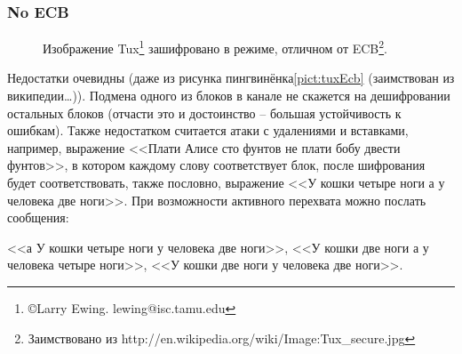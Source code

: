 \begin{frame}
    \frametitle{No ECB}
    
    \begin{figure}
        \begin{center}
        \end{center}
        \caption{Изображение Tux\footnote{\copyright Larry Ewing. lewing@isc.tamu.edu} зашифровано в режиме, отличном от ECB\footnote{Заимствовано из http://en.wikipedia.org/wiki/Image:Tux\_secure.jpg}.}\label{pict:tuxSecure}
    \end{figure} 
\end{frame}

Недостатки очевидны (даже из рисунка пингвинёнка\ref{pict:tuxEcb} (заимствован из википедии\ldots)). Подмена одного из блоков в канале не скажется на дешифровании остальных блоков (отчасти это и достоинство – большая устойчивость к ошибкам). Также недостатком считается атаки с удалениями и вставками, например, выражение <<Плати Алисе сто фунтов не плати бобу двести фунтов>>, в котором каждому слову соответствует блок, после шифрования будет соответствовать, также пословно, выражение <<У кошки четыре ноги а у человека две ноги>>.  При возможности активного перехвата можно послать сообщения:

<<а У кошки четыре ноги у человека две ноги>>,
<<У кошки две ноги а у человека четыре ноги>>,
<<У кошки две ноги у человека две ноги>>.

